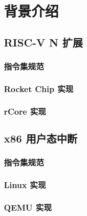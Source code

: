 
\chapter{背景介绍}

\section{RISC-V N 扩展}
\subsection{指令集规范}
\subsection{Rocket Chip 实现}
\subsection{rCore 实现}

\section{x86 用户态中断}

\subsection{指令集规范}
\subsection{Linux 实现}
\subsection{QEMU 实现}